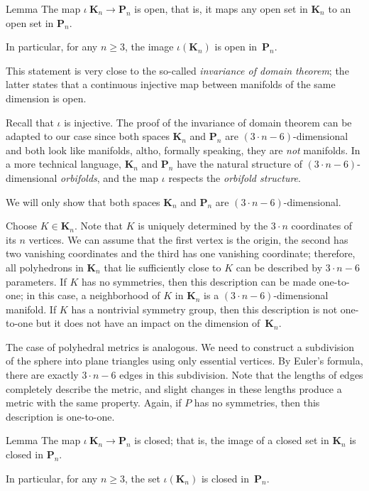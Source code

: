 \begin{thm}{Lemma}
The map $\iota\:\mathbf{K}_n\to\mathbf{P}_n$ is open, 
that is, it maps any open set in $\mathbf{K}_n$ to an open set in $\mathbf{P}_n$.

In particular, for any $n\ge 3$, the image $\iota(\mathbf{K}_n)$ is open in~$\mathbf{P}_n$.
\end{thm}

This statement is very close to the so-called \emph{invariance of domain theorem};
the latter states that a continuous injective map between manifolds of the same dimension is open.

Recall that $\iota$ is injective.
The proof of the invariance of domain theorem can be adapted to our case since both spaces $\mathbf{K}_n$ and $\mathbf{P}_n$ are $(3\cdot n-6)$-dimensional and both look like manifolds, altho, formally speaking, they are \textit{not} manifolds.
In a more technical language, $\mathbf{K}_n$ and $\mathbf{P}_n$ have the natural structure of $(3\cdot n-6)$-dimensional \emph{orbifolds},
and the map $\iota$ respects the \emph{orbifold structure}.

We will only show that both spaces $\mathbf{K}_n$ and $\mathbf{P}_n$ are $(3\cdot n-6)$-dimensional.

Choose  $K\in\mathbf{K}_n$.
Note that $K$ is uniquely determined by the $3\cdot n$ coordinates of its $n$ vertices.
We can assume that the first vertex is the origin, the second has two vanishing coordinates and the third has one vanishing coordinate; therefore, all polyhedrons in $\mathbf{K}_n$ that lie sufficiently close to $K$ can be described by $3\cdot n-6$ parameters.
If $K$ has no symmetries, then this description can be made one-to-one;
in this case, a neighborhood of $K$ in $\mathbf{K}_n$ is a $(3\cdot n-6)$-dimensional manifold.
If $K$ has a nontrivial symmetry group, then this description is not one-to-one but it does not have an impact on the dimension of~$\mathbf{K}_n$.

The case of polyhedral metrics is analogous.
We need to construct a subdivision of the sphere into plane triangles using only essential vertices.
By Euler's formula, there are exactly $3\cdot n-6$ edges in this subdivision.
Note that the lengths of edges completely describe the metric, and slight changes in these lengths produce a metric with the same property.
Again, if $P$ has no symmetries, then this description is one-to-one.

\begin{thm}{Lemma}
The map $\iota\:\mathbf{K}_n\to\mathbf{P}_n$ is closed;
that is, the image of a closed set in $\mathbf{K}_n$ is closed in $\mathbf{P}_n$.

In particular, for any $n\ge 3$, the set $\iota(\mathbf{K}_n)$ is closed in~$\mathbf{P}_n$.
\end{thm}

